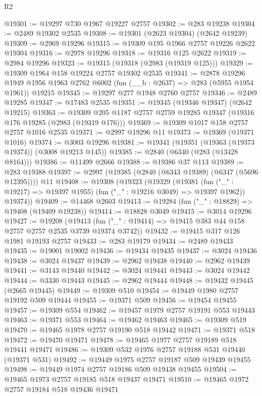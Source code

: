 \begin{lexlean}{R2}
\begin{coremodule}
@19301 := @19297 @730 @1967 @19227 @2757
@19302 := @283 @19238
@19304 := @2489 @19302 @2535
@19308 := @19301 (@2623 @19304) (@2642 @19239)
@19309 := @2969 @19296
@19315 := @19309 @195 @1966 @2757 @19226 @2622 @19304
@19316 := @2978 @19296
@19318 := @19316 @125 @2622
@19319 := @2984 @19296
@19323 := @19315 (@19318 (@2983 (@19319 @125)))
@19329 := @19309 @1964 @158 @19224 @2757 @19302 @2535
@19341 := @2878
    @19296
    @1949
    @1956
    @1963
    @2762
    @6002
    (fun (__b : @2637) => @283 (@5955 @1954 @1961))
    @19215
@19345 := @19297 @277 @1948 @2760 @2757
@19346 := @2489 @19285
@19347 := @17483 @2535
@19351 := @19345 (@19346 @19347) (@2642 @19215)
@19363 := @19309 @205 @1187 @2757 @2759 @19285 @19347 (@19316 @176 @19285 (@2983 (@19319 @176)))
@19369 := @19309 @1017 @158 @2757 @2757 @1016 @2535
@19371 := @2997 @19296 @11
@19373 := @19369 (@19371 @1016)
@19374 := @3003 @19296
@19381 := @19341 (@19351 (@19363 (@19373 @19374)) (@3008 @19213 @145))
@19385 := @2840 (@6340 (@283 (@13428 @8164)))
@19386 := @11499 @2666
@19388 := @19386 @37 @113
@19389 := @283 @19388
@19397 := @2997 (@19385 (@2840 (@6343 @19389) (@6347 (@5696 @12395)))) @11
@19408 := @19308
    (@19323
      (@19329
        (@19381 (fun ("_" : @19217) => @19397 @1955) (fun ("_" : @19216 @3049) => @19397 @1962))
        @19374))
@19409 := @14468 @2603
@19413 := @19284 (fun ("_" : @18829) => @19408 (@19409 @19238))
@19414 := @18828 @3049
@19415 := @3014 @19296
@19427 := @19208
    (@19413 (fun ("_" : @19414) => @19415 @383 @44 @158 @2757 @2757 @2535 @3739 @19374 @3742))
@19432 := @19415 @317 @126 @1981 @19193 @2757
@19433 := @283 @19179
@19434 := @2489 @19433
@19435 := @19001 @19002
@19436 := @19434 @19435
@19437 := @3024 @19436
@19438 := @3024 @19437
@19439 := @2962 @19438
@19440 := @2962 @19439
@19441 := @3143 @19440
@19442 := @3024 @19441
@19443 := @3024 @19442
@19444 := @3330 @19443
@19445 := @2962 @19444
@19448 := @19432 @19445 (@2665 @19445)
@19449 := @19309 @510
@19454 := @19449 @1980 @2757 @19192 @509 @19444
@19455 := @19371 @509
@19456 := @19454 @19455
@19457 := @19309 @554
@19462 := @19457 @1979 @2757 @19191 @553 @19443
@19463 := @19371 @553
@19464 := @19462 @19463
@19465 := @19309 @519
@19470 := @19465 @1978 @2757 @19190 @518 @19442
@19471 := @19371 @518
@19472 := @19470 @19471
@19478 := @19465 @1977 @2757 @19189 @518 @19441 @19471
@19486 := @19309 @532 @1976 @2757 @19188 @531 @19440 (@19371 @531)
@19492 := @19449 @1975 @2757 @19187 @509 @19439 @19455
@19498 := @19449 @1974 @2757 @19186 @509 @19438 @19455
@19504 := @19465 @1973 @2757 @19185 @518 @19437 @19471
@19510 := @19465 @1972 @2757 @19184 @518 @19436 @19471

\end{coremodule}
\end{lexlean}
